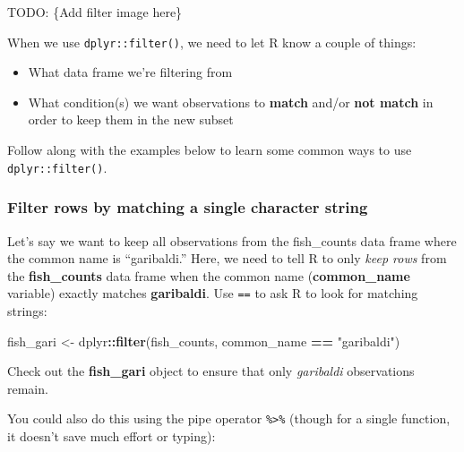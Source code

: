 \documentclass[]{book}
\newenvironment{Shaded}{\begin{snugshade}}{\end{snugshade}}
\newcommand{\KeywordTok}[1]{\textcolor[rgb]{0.13,0.29,0.53}{\textbf{#1}}}
\newcommand{\NormalTok}[1]{#1}
\newcommand{\OperatorTok}[1]{\textcolor[rgb]{0.81,0.36,0.00}{\textbf{#1}}}
\newcommand{\StringTok}[1]{\textcolor[rgb]{0.31,0.60,0.02}{#1}}
\providecommand{\tightlist}{%
  \setlength{\itemsep}{0pt}\setlength{\parskip}{0pt}}
\begin{document}
TODO: \{Add filter image here\}

When we use \texttt{dplyr::filter()}, we need to let R know a couple of things:

\begin{itemize}
\tightlist
\item
  What data frame we're filtering from
\item
  What condition(s) we want observations to \textbf{match} and/or \textbf{not match} in order to keep them in the new subset
\end{itemize}

Follow along with the examples below to learn some common ways to use \texttt{dplyr::filter()}.

\hypertarget{filter-rows-by-matching-a-single-character-string}{%
\subsubsection{Filter rows by matching a single character string}\label{filter-rows-by-matching-a-single-character-string}}

Let's say we want to keep all observations from the fish\_counts data frame where the common name is ``garibaldi.'' Here, we need to tell R to only \emph{keep rows} from the \textbf{fish\_counts} data frame when the common name (\textbf{common\_name} variable) exactly matches \textbf{garibaldi}.
Use \texttt{==} to ask R to look for matching strings:

\begin{Shaded}
\begin{Highlighting}[]
\NormalTok{fish_gari <-}\StringTok{ }\NormalTok{dplyr}\OperatorTok{::}\KeywordTok{filter}\NormalTok{(fish_counts, common_name }\OperatorTok{==}\StringTok{ "garibaldi"}\NormalTok{)}
\end{Highlighting}
\end{Shaded}

Check out the \textbf{fish\_gari} object to ensure that only \emph{garibaldi} observations remain.

You could also do this using the pipe operator \texttt{\%\textgreater{}\%} (though for a single function, it doesn't save much effort or typing):

\begin{Shaded}
\end{Shaded}
\end{document}
